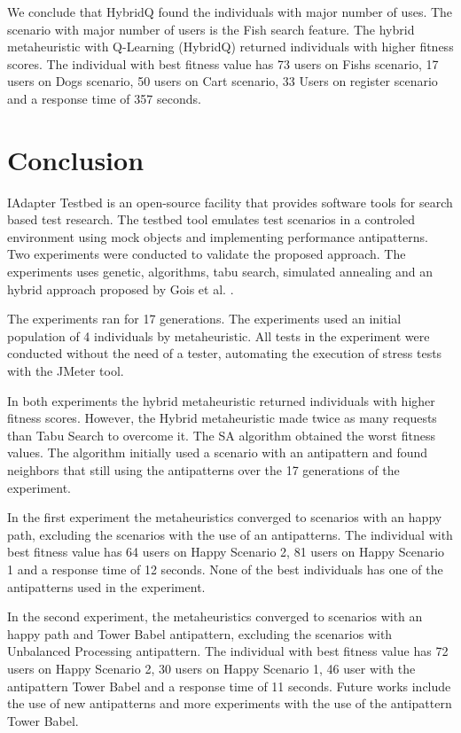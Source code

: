 We conclude that HybridQ found the individuals with major number of uses. The scenario with major number of users is the Fish search feature. The hybrid metaheuristic with Q-Learning (HybridQ) returned individuals with higher fitness scores.  The individual with best fitness value has 73 users on Fishs scenario, 17 users on Dogs scenario, 50 users on Cart scenario, 33 Users on register scenario  and a response time of 357 seconds. 


\section{Conclusion}

IAdapter Testbed is an open-source facility that provides software tools for search based test research. The testbed tool emulates test scenarios in a controled environment using mock objects and implementing performance antipatterns.  Two experiments were conducted to validate the proposed approach. The experiments uses genetic, algorithms, tabu search, simulated annealing and an hybrid approach proposed by Gois et al. \cite{Gois2016}.

The experiments ran for 17 generations. The experiments used an initial population of 4 individuals by metaheuristic. All tests in the experiment were conducted without the need of a tester, automating the execution of stress tests with the JMeter tool.

In both experiments the hybrid metaheuristic returned individuals with higher fitness scores. However, the Hybrid metaheuristic made twice as many requests than Tabu Search to overcome it. The SA algorithm obtained the worst fitness values. The algorithm initially used a scenario with an antipattern and found neighbors that still using the antipatterns over the 17 generations of the experiment.

In the first experiment the metaheuristics converged to scenarios with an happy path, excluding the scenarios with the use of an antipatterns. The individual with best fitness value has 64 users on Happy Scenario 2, 81 users on Happy Scenario 1 and a response time of 12 seconds. None of the best individuals has one of the antipatterns used in the experiment.


In the second experiment,  the metaheuristics converged to scenarios with an happy path and Tower Babel antipattern, excluding the scenarios with Unbalanced Processing antipattern. The individual with best fitness value has 72 users on Happy Scenario 2, 30 users on Happy Scenario 1, 46 user with the antipattern Tower Babel and a response time of 11 seconds. Future works include the use of new antipatterns and more experiments with the use of the antipattern Tower Babel.





